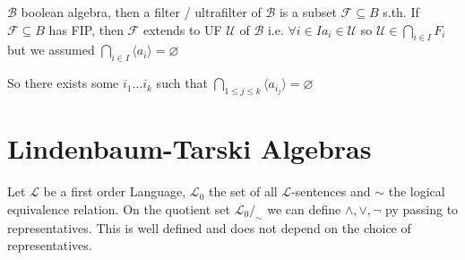 {\begin{enumerate}
\begin{multicols}{2}
            $\mathcal{B}$ boolean algebra, then a filter / ultrafilter of $\mathcal{B}$ is a subset $\mathcal{F}\subseteq B$ s.th.
            If $\mathcal{F}\subseteq B$ has FIP, then $\mathcal{F}$ extends to UF $\mathcal{U}$ of $\mathcal{B}$
            i.e. $\forall i\in I a_i\in \mathcal{U}$ so $\mathcal{U}\in \bigcap_{i\in I}F_i $ but we assumed $\bigcap_{i\in I}\langle a_i\rangle = \varnothing$
        \end{multicols}
        So there exists some $i_1\dots i_k$ such that $\bigcap_{1\leq j\leq k}\langle a_{i_j}\rangle =\varnothing$
    \end{enumerate}
}


\section{Lindenbaum-Tarski Algebras}
Let $\mathcal{L}$ be a first order Language, $\mathcal{L}_0$ the set of all $\mathcal{L}$-sentences and $\sim$ the logical equivalence relation.
On the quotient set $\mathcal{L}_0/_\sim$ we can define $\land,\lor,\lnot$ py passing to representatives. This is well defined and does not depend on the choice of representatives.

